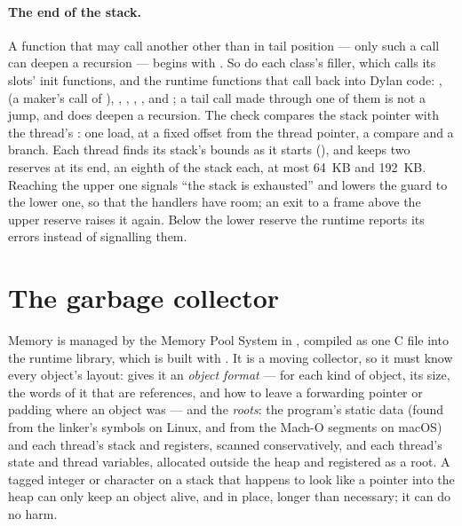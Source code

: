 \paragraph{The end of the stack.}
A function that may call another other than in tail position --- only
such a call can deepen a recursion --- begins with
. So do each class's filler, which calls its
slots' init functions, and the runtime functions that call back into
Dylan code: ,  (a maker's
call of ), ,
, , ,
 and ; a tail call
made through one of them is not a jump, and does deepen a recursion. The check compares the stack pointer
with the thread's : one load, at a fixed offset from the
thread pointer, a compare and a branch. Each thread finds its stack's
bounds as it starts (), and keeps two reserves at
its end, an eighth of the stack each, at most 64~KB and 192~KB. Reaching
the upper one signals ``the stack is exhausted'' and lowers the guard to
the lower one, so that the handlers have room; an exit to a frame above
the upper reserve raises it again. Below the lower reserve the runtime
reports its errors instead of signalling them.

\section{The garbage collector}\label{sec:internals-gc}

Memory is managed by the Memory Pool System in ,
compiled as one C file into the runtime library, which is built with
. It is a moving collector, so it must know every object's
layout:  gives it an \emph{object format} ---
for each kind of object, its size, the words of it that are references,
and how to leave a forwarding pointer or padding where an object was ---
and the \emph{roots}: the program's static data (found from the linker's
symbols on Linux, and from the Mach-O segments on macOS) and each
thread's stack and registers, scanned conservatively, and each thread's
state and thread variables, allocated outside the heap and registered
as a root. A tagged integer or character on a stack that happens to look
like a pointer into the heap can only keep an object alive, and in
place, longer than necessary; it can do no harm.

